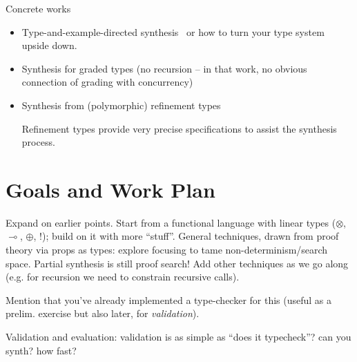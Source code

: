 \documentclass{llncs}
\newcommand{\lolli}{\multimap}
\newcommand{\tensor}{\otimes}
\newcommand{\bang}{{!}}
\begin{document}
Concrete works
\begin{itemize}


\item Type-and-example-directed
  synthesis~\cite{DBLP:conf/pldi/OseraZ15,DBLP:conf/popl/FrankleOWZ16}
  or how to turn your type system upside down.

  \item Synthesis for graded types (no recursion   -- in that work, no
  obvious connection of grading with
  concurrency)~\cite{DBLP:conf/lopstr/HughesO20}
  
  
\item Synthesis from (polymorphic) refinement types~\cite{DBLP:conf/pldi/PolikarpovaKS16}

Refinement types provide very precise specifications to assist the
synthesis process.





\end{itemize}

\section{Goals and Work Plan}



Expand on earlier points. Start from a functional language with linear
types ($\tensor$, $\lolli$, $\oplus$, $\bang$); build on it with more
``stuff''. General techniques, drawn from proof theory via props as
types: explore focusing to tame non-determinism/search space. Partial
synthesis is still proof search! Add other techniques as we go along
(e.g. for recursion we need to constrain recursive calls).

Mention that you've already implemented a type-checker for this
(useful as a prelim. exercise but also later, for \emph{validation}).

Validation and evaluation: validation is as simple as ``does it typecheck''? can you synth? how fast?
\end{document}

